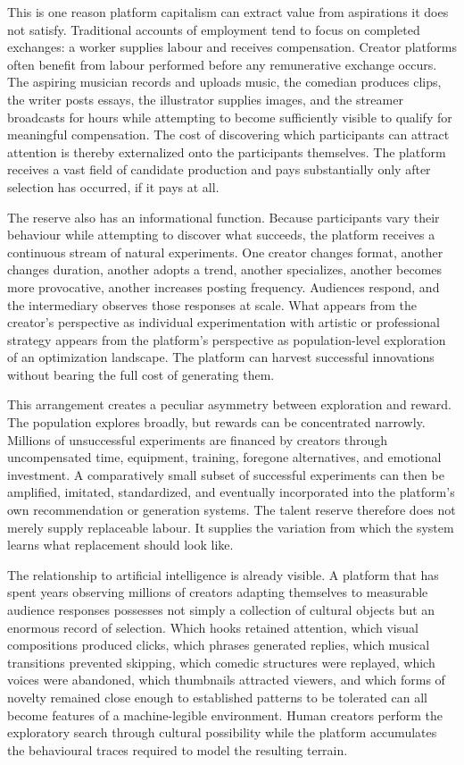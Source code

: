 \documentclass[11pt]{article}
\begin{document}
This is one reason platform capitalism can extract value from aspirations it does not satisfy. Traditional accounts of employment tend to focus on completed exchanges: a worker supplies labour and receives compensation. Creator platforms often benefit from labour performed before any remunerative exchange occurs. The aspiring musician records and uploads music, the comedian produces clips, the writer posts essays, the illustrator supplies images, and the streamer broadcasts for hours while attempting to become sufficiently visible to qualify for meaningful compensation. The cost of discovering which participants can attract attention is thereby externalized onto the participants themselves. The platform receives a vast field of candidate production and pays substantially only after selection has occurred, if it pays at all.

The reserve also has an informational function. Because participants vary their behaviour while attempting to discover what succeeds, the platform receives a continuous stream of natural experiments. One creator changes format, another changes duration, another adopts a trend, another specializes, another becomes more provocative, another increases posting frequency. Audiences respond, and the intermediary observes those responses at scale. What appears from the creator's perspective as individual experimentation with artistic or professional strategy appears from the platform's perspective as population-level exploration of an optimization landscape. The platform can harvest successful innovations without bearing the full cost of generating them.

This arrangement creates a peculiar asymmetry between exploration and reward. The population explores broadly, but rewards can be concentrated narrowly. Millions of unsuccessful experiments are financed by creators through uncompensated time, equipment, training, foregone alternatives, and emotional investment. A comparatively small subset of successful experiments can then be amplified, imitated, standardized, and eventually incorporated into the platform's own recommendation or generation systems. The talent reserve therefore does not merely supply replaceable labour. It supplies the variation from which the system learns what replacement should look like.

The relationship to artificial intelligence is already visible. A platform that has spent years observing millions of creators adapting themselves to measurable audience responses possesses not simply a collection of cultural objects but an enormous record of selection. Which hooks retained attention, which visual compositions produced clicks, which phrases generated replies, which musical transitions prevented skipping, which comedic structures were replayed, which voices were abandoned, which thumbnails attracted viewers, and which forms of novelty remained close enough to established patterns to be tolerated can all become features of a machine-legible environment. Human creators perform the exploratory search through cultural possibility while the platform accumulates the behavioural traces required to model the resulting terrain.
\end{document}
